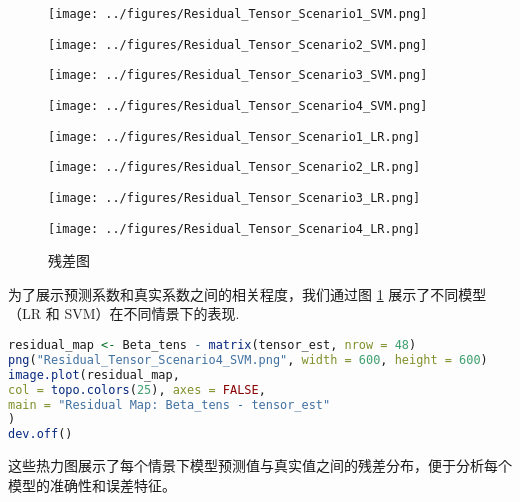 \documentclass[AutoFakeBold]{LZUThesis}
\begin{document}
\begin{figure}[h]
	\centering
	\begin{minipage}{0.24\textwidth}
		\centering
		\texttt{[image: ../figures/Residual\_Tensor\_Scenario1\_SVM.png]}
		\label{fig:residual_scenario1_SVM}
	\end{minipage}
	\hfill
	\begin{minipage}{0.24\textwidth}
		\centering
		\texttt{[image: ../figures/Residual\_Tensor\_Scenario2\_SVM.png]}
		\label{fig:residual_scenario2_SVM}
	\end{minipage}
	\hfill
	\begin{minipage}{0.24\textwidth}
		\centering
		\texttt{[image: ../figures/Residual\_Tensor\_Scenario3\_SVM.png]}
		\label{fig:residual_scenario3_SVM}
	\end{minipage}
	\hfill
	\begin{minipage}{0.24\textwidth}
		\centering
		\texttt{[image: ../figures/Residual\_Tensor\_Scenario4\_SVM.png]}
		\label{fig:residual_scenario4_SVM}
	\end{minipage}
	
	\begin{minipage}{0.24\textwidth}
		\centering
		\texttt{[image: ../figures/Residual\_Tensor\_Scenario1\_LR.png]}
		\label{fig:residual_scenario1_LR}
	\end{minipage}
	\hfill
	\begin{minipage}{0.24\textwidth}
		\centering
		\texttt{[image: ../figures/Residual\_Tensor\_Scenario2\_LR.png]}
		\label{fig:residual_scenario2_LR}
	\end{minipage}
	\hfill
	\begin{minipage}{0.24\textwidth}
		\centering
		\texttt{[image: ../figures/Residual\_Tensor\_Scenario3\_LR.png]}
		\label{fig:residual_scenario3_LR}
	\end{minipage}
	\hfill
	\begin{minipage}{0.24\textwidth}
		\centering
		\texttt{[image: ../figures/Residual\_Tensor\_Scenario4\_LR.png]}
		\label{fig:residual_scenario4_LR}
	\end{minipage}
	
	\caption{残差图}
	\label{fig:residual_maps_all}
\end{figure}
为了展示预测系数和真实系数之间的相关程度，我们通过图 \ref{fig:residual_maps_all} 展示了不同模型（LR 和 SVM）在不同情景下的表现. 

\begin{lstlisting}[language=R]
residual_map <- Beta_tens - matrix(tensor_est, nrow = 48)
png("Residual_Tensor_Scenario4_SVM.png", width = 600, height = 600)
image.plot(residual_map,
col = topo.colors(25), axes = FALSE,
main = "Residual Map: Beta_tens - tensor_est"
)
dev.off()
\end{lstlisting}
这些热力图展示了每个情景下模型预测值与真实值之间的残差分布，便于分析每个模型的准确性和误差特征。
\end{document}
